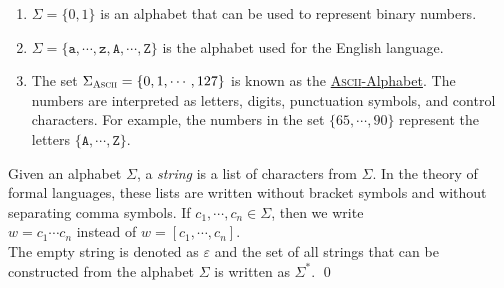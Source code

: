 \examplesEng
\begin{enumerate}
\item $\Sigma = \{ 0, 1\}$ is an alphabet that can be used to represent binary numbers.
\item $\Sigma = \{ \mathtt{a}, \cdots, \mathtt{z}, \mathtt{A}, \cdots, \mathtt{Z} \}$ 
      is the alphabet used for the English language.
\item The set $\Sigma_{\textsc{\scriptsize Ascii}} = \{ 0, 1, \cdots, 127 \}$ is known as the
      \href{http://en.wikipedia.org/wiki/ASCII}{\textsc{Ascii}-Alphabet}.  The numbers are
      interpreted as letters, digits, punctuation symbols, and control characters.
      For example, the numbers in the set $\{65, \cdots, 90 \}$ represent the letters
      $\{\mathtt{A}, \cdots, \mathtt{Z}\}$.  
      \eox
\end{enumerate}

\begin{Definition}[Strings]
Given an alphabet $\Sigma$, a \emph{string} is a list of characters from $\Sigma$.
In the theory of formal languages, these lists are written without bracket symbols and without
separating comma symbols.  If $c_1,\cdots,c_n \in \Sigma$, then we write 
\\[0.2cm]
\hspace*{1.3cm}
$w = c_1\cdots c_n$ \quad instead of \quad $w = [c_1,\cdots,c_n]$.
\\[0.2cm]
The empty string is denoted as $\varepsilon$ and  the set of all strings that can be constructed
from the alphabet $\Sigma$ is written as $\Sigma^*$.
\qed
\end{Definition}

